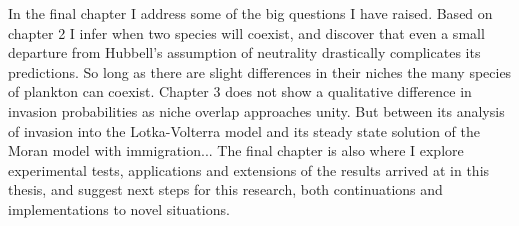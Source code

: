 In the final chapter I address some of the big questions I have raised. 
Based on chapter 2 I infer when two species will coexist, and discover that even a small departure from Hubbell's assumption of neutrality drastically complicates its predictions. 
So long as there are slight differences in their niches the many species of plankton can coexist. 
Chapter 3 does not show a qualitative difference in invasion probabilities as niche overlap approaches unity. 
But between its analysis of invasion into the Lotka-Volterra model and its steady state solution of the Moran model with immigration...
The final chapter is also where I explore experimental tests, applications and extensions of the results arrived at in this thesis, and suggest next steps for this research, both continuations and implementations to novel situations. 



